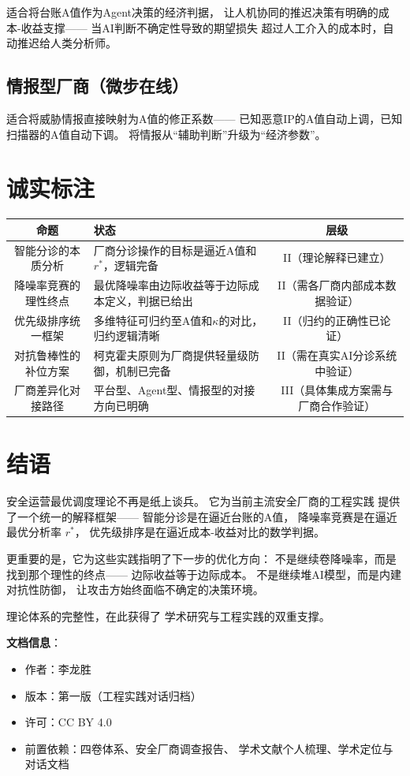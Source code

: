 \documentclass[11pt,a4paper]{article}
\begin{document}
适合将台账A值作为Agent决策的经济判据，
让人机协同的推迟决策有明确的成本-收益支撑——
当AI判断不确定性导致的期望损失
超过人工介入的成本时，自动推迟给人类分析师。

\subsection{情报型厂商（微步在线）}

适合将威胁情报直接映射为A值的修正系数——
已知恶意IP的A值自动上调，已知扫描器的A值自动下调。
将情报从“辅助判断”升级为“经济参数”。

\section{诚实标注}

\begin{center}
\begin{xltabular}{\textwidth}{c|X|c}
\toprule
\textbf{命题} & \textbf{状态} & \textbf{层级} \\
\midrule
智能分诊的本质分析 &
厂商分诊操作的目标是逼近A值和 \(r^*\)，逻辑完备 &
II（理论解释已建立） \\
降噪率竞赛的理性终点 &
最优降噪率由边际收益等于边际成本定义，判据已给出 &
II（需各厂商内部成本数据验证） \\
优先级排序统一框架 &
多维特征可归约至A值和\(\kappa\)的对比，归约逻辑清晰 &
II（归约的正确性已论证） \\
对抗鲁棒性的补位方案 &
柯克霍夫原则为厂商提供轻量级防御，机制已完备 &
II（需在真实AI分诊系统中验证） \\
厂商差异化对接路径 &
平台型、Agent型、情报型的对接方向已明确 &
III（具体集成方案需与厂商合作验证） \\
\bottomrule
\end{xltabular}
\end{center}

\section{结语}

安全运营最优调度理论不再是纸上谈兵。
它为当前主流安全厂商的工程实践
提供了一个统一的解释框架——
智能分诊是在逼近台账的A值，
降噪率竞赛是在逼近最优分析率 \(r^*\)，
优先级排序是在逼近成本-收益对比的数学判据。

更重要的是，它为这些实践指明了下一步的优化方向：
不是继续卷降噪率，而是找到那个理性的终点——
边际收益等于边际成本。
不是继续堆AI模型，而是内建对抗性防御，
让攻击方始终面临不确定的决策环境。

理论体系的完整性，在此获得了
学术研究与工程实践的双重支撑。

\vspace{5mm}
\noindent\textbf{文档信息}：
\begin{itemize}
    \item 作者：李龙胜
    \item 版本：第一版（工程实践对话归档）
    \item 许可：CC BY 4.0
    \item 前置依赖：四卷体系、安全厂商调查报告、
          学术文献个人梳理、学术定位与对话文档
\end{itemize}
\end{document}
